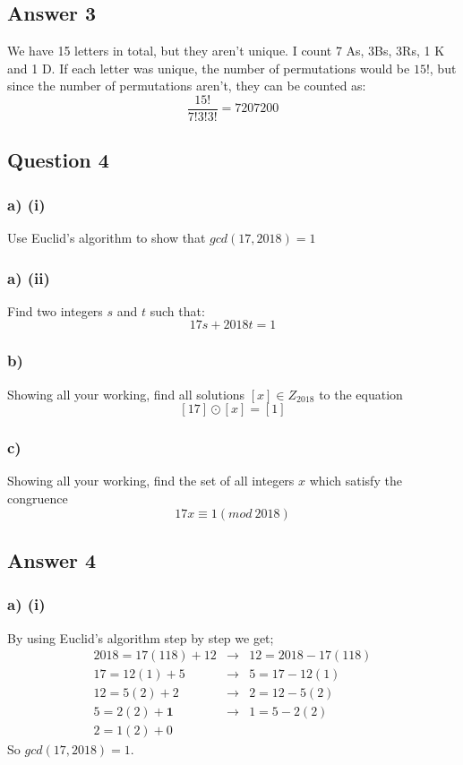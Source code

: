 \documentclass{article}
\begin{document}
	\subsection*{Answer 3}
	We have 15 letters in total, but they aren't unique. I count 7 As, 3Bs, 3Rs, 1 K and 1 D.
	If each letter was unique, the number of permutations would be $15!$, but since the number of permutations aren't, they can be counted as:
	$$
	\frac{15!}{7!3!3!} = 7207200
	$$
	
	\subsection*{Question 4}
	\subsubsection*{a) (i)}
	Use Euclid's algorithm to show that $gcd(17,2018)=1$
	\subsubsection*{a) (ii)}
	Find two integers $s$ and $t$ such that:
	$$
	17s+2018t=1
	$$
	
	\subsubsection*{b)}
	Showing all your working, find all solutions $[x] \in Z_{2018}$ to the equation
	$$
	[17] \odot [x] = [1]
	$$
	
	\subsubsection*{c)}
	Showing all your working, find the set of all integers $x$ which satisfy the congruence
	$$
	17x \equiv 1 (mod \ 2018)
	$$
	
	\subsection*{Answer 4}
	\subsubsection*{a) (i)}
	By using Euclid's algorithm step by step we get;
	\begin{align*}
	2018 = 17(118) + 12 & \rightarrow & 12 = 2018-17(118) \\
	17=12(1)+5 & \rightarrow & 5=17-12(1) \\
	12=5(2)+2 & \rightarrow & 2=12-5(2) \\
	5=2(2)+\textbf{1} & \rightarrow & 1=5-2(2) \\
	2=1(2) + 0
	\end{align*}
	So $gcd(17,2018)=1$.
\end{document}
